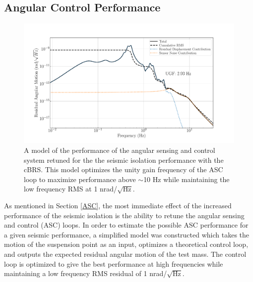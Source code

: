 \documentclass [12pt, proquest]{uwthesis}[2019]
\begin{document}
\subsection{Angular Control Performance}

\begin{figure}[!h]
\begin{center}
\includegraphics[width=\textwidth]{cBRS_ASC_With.pdf}
\caption[Projected performance of the angular sensing and control system]{A model of the performance of the angular sensing and control system retuned for the the seismic isolation performance with the cBRS. This model optimizes the unity gain frequency of the ASC loop to maximize performance above $\sim$10 Hz while maintaining the low frequency RMS at 1 nrad/$\sqrt{\text{Hz}}$.}
\label{ascWith}
\end{center}
\end{figure}

As mentioned in Section \ref{ASC}, the most immediate effect of the increased performance of the seismic isolation is the ability to retune the angular sensing and control (ASC) loops. In order to estimate the possible ASC performance for a given seismic performance, a simplified model was constructed \cite{ascModel} which takes the motion of the suspension point as an input, optimizes a theoretical control loop, and outputs the expected residual angular motion of the test mass. The control loop is optimized to give the best performance at high frequencies while maintaining a low frequency RMS residual of 1 nrad/$\sqrt{\text{Hz}}$.
\end{document}
